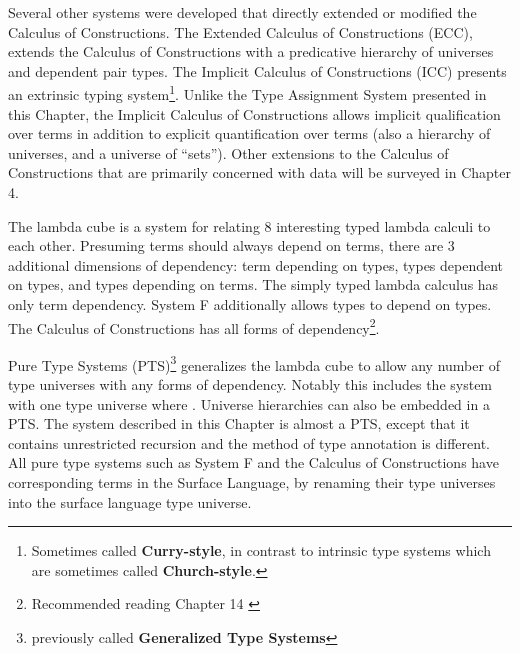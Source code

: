 Several other systems were developed that directly extended or modified the Calculus of Constructions.
The Extended Calculus of Constructions (\ac{ECC})\cite{luo1990extended,luo1994computation}, extends the Calculus of Constructions with a predicative hierarchy of universes and dependent pair types.
The Implicit Calculus of Constructions (\ac{ICC})\cite{10.1007/3-540-45413-6_27,10.1007/978-3-540-78499-9_26} presents an extrinsic typing system\footnote{
  Sometimes called \textbf{Curry-style}, in contrast to intrinsic type systems which are sometimes called \textbf{Church-style}.
}.
Unlike the Type Assignment System presented in this Chapter, the Implicit Calculus of Constructions allows implicit qualification over terms in addition to explicit quantification over terms (also a hierarchy of universes, and a universe of ``sets'').
Other extensions to the Calculus of Constructions that are primarily concerned with data will be surveyed in Chapter 4.
 
The lambda cube is a system for relating 8 interesting typed lambda calculi to each other.
Presuming terms should always depend on terms, there are 3 additional dimensions of dependency: term depending on types, types dependent on types, and types depending on terms.
The simply typed lambda calculus has only term dependency.
System F additionally allows types to depend on types.
The Calculus of Constructions has all forms of dependency\footnote{Recommended reading Chapter 14 \cite{sorensen2006lectures}}.
 
Pure Type Systems (\ac{PTS})\footnote{previously called \textbf{Generalized Type Systems}} generalizes the lambda cube to allow any number of type universes with any forms of dependency.
Notably this includes the system with one type universe where \tit{}.
Universe hierarchies can also be embedded in a \ac{PTS}.
The system described in this Chapter is almost a \ac{PTS}, except that it contains unrestricted recursion and the method of type annotation is different.
All pure type systems such as System F and the Calculus of Constructions have corresponding terms in the Surface Language, by renaming their type universes into the surface language type universe.
 
 
